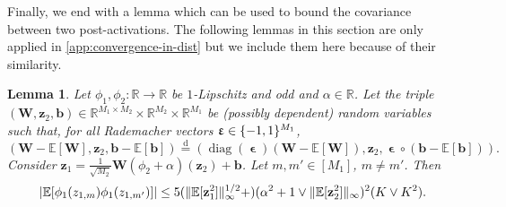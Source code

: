 \documentclass[twoside]{article}
\newcommand{\vb}{\mathbf{b}}
\newcommand{\vx}{\mathbf{x}}
\newcommand{\vz}{\mathbf{z}}
\newcommand{\vep}{\bm{\upvarepsilon}}
\newcommand{\mW}{\mathbf{W}}
\newcommand{\E}{\mathbb{E}}
\newcommand{\R}{\mathbb{R}}
\newcommand{\disteq}{\overset{\text{d}}{=}}
\newcommand{\opspace}{}
\newcommand{\diag}{\operatorname{diag}\opspace}
\newcommand{\had}{\circ}
\DeclarePairedDelimiter\set{\{}{\}}              %
\DeclarePairedDelimiter\norm{\|}{\|}             %
\DeclarePairedDelimiter\abs{|}{|}                %
\theoremstyle{theoremstyle}
\newtheorem{lemma}[theorem]{Lemma}
\begin{document}
%

Finally, we end with a lemma which can be used to bound the covariance between two post-activations. The following lemmas in this section are only applied in \cref{app:convergence-in-dist} but we include them here because of their similarity. 

\begin{lemma} \label{lem:cov}
    Let $\phi_1, \phi_2 \colon\R \to \R$ be $1$-Lipschitz and odd and $\alpha \in \R$.
    Let the triple $(\mW, \vz_2, \vb) \in \R^{M_1\times M_2} \times \R^{M_2} \times \R^{M_1}$ be (possibly dependent) random variables such that, for all Rademacher vectors $\vep \in \set{-1, 1}^{M_1}$,
    \begin{equation}
        (\mW - \E[\mW], \vz_2, \vb - \E[\vb])
        \disteq
        (\diag(\vep)(\mW - \E[\mW]), \vz_2, \vep \had (\vb - \E[\vb])).
    \end{equation}
    Consider $\vz_1 = \tfrac1{\sqrt{M_2}}\mW (\phi_2 + \alpha)(\vz_2) + \vb$.
    Let $m, m' \in [M_1]$, $m \neq m'$.
    Then
    \begin{equation}
        \abs{\E[\phi_1(z_{1,m}) \phi_1(z_{1,m'})]}
        \le
            5(
                \norm{\E[\vz_1^2]}_\infty^{1/2}
                + 
            )(\alpha^2 + 1 \lor \norm{ \E[\vz_2^2] }_\infty)^2(K \lor K^2).
    \end{equation}
\end{lemma}
\end{document}
